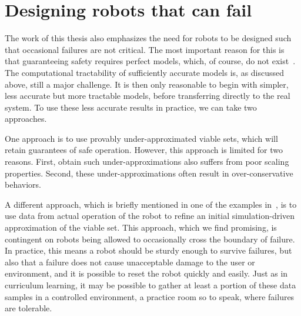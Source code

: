 

\section{Designing robots that can fail}
The work of this thesis also emphasizes the need for robots to be designed such that occasional failures are not critical. The most important reason for this is that guaranteeing safety requires perfect models, which, of course, do not exist~\cite{box1976science}. The computational tractability of sufficiently accurate models is, as discussed above, still a major challenge. It is then only reasonable to begin with simpler, less accurate but more tractable models, before transferring directly to the real system. To use these less accurate results in practice, we can take two approaches. \par
One approach is to use provably under-approximated viable sets, which will retain guarantees of safe operation. However, this approach is limited for two reasons. First, obtain such under-approximations also suffers from poor scaling properties. Second, these under-approximations often result in over-conservative behaviors. \par
A different approach, which is briefly mentioned in one of the examples in~\cite{heim2019learnable}, is to use data from actual operation of the robot to refine an initial simulation-driven approximation of the viable set. This approach, which we find promising, is contingent on robots being allowed to occasionally cross the boundary of failure. In practice, this means a robot should be sturdy enough to survive failures, but also that a failure does not cause unacceptable damage to the user or environment, and it is possible to reset the robot quickly and easily. Just as in curriculum learning, it may be possible to gather at least a portion of these data samples in a controlled environment, a practice room so to speak, where failures are tolerable. \par

